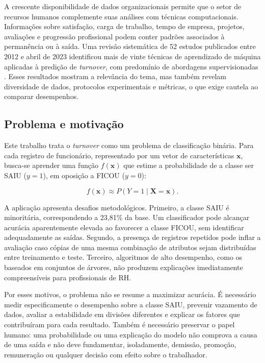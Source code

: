 \documentclass[12pt]{article}
\begin{document}
A crescente disponibilidade de dados organizacionais permite que o setor de recursos humanos complemente suas análises com técnicas computacionais. Informações sobre satisfação, carga de trabalho, tempo de empresa, projetos, avaliações e progressão profissional podem conter padrões associados à permanência ou à saída. Uma revisão sistemática de 52 estudos publicados entre 2012 e abril de 2023 identificou mais de vinte técnicas de aprendizado de máquina aplicadas à predição de \textit{turnover}, com predomínio de abordagens supervisionadas \cite{akasheh2024decade}. Esses resultados mostram a relevância do tema, mas também revelam diversidade de dados, protocolos experimentais e métricas, o que exige cautela ao comparar desempenhos.

\subsection{Problema e motivação}

Este trabalho trata o \textit{turnover} como um problema de classificação binária. Para cada registro de funcionário, representado por um vetor de características $\mathbf{x}$, busca-se aprender uma função $f(\mathbf{x})$ que estime a probabilidade de a classe ser SAIU ($y=1$), em oposição a FICOU ($y=0$):

\begin{equation}
f(\mathbf{x}) \approx P(Y=1\mid \mathbf{X}=\mathbf{x}).
\end{equation}

A aplicação apresenta desafios metodológicos. Primeiro, a classe SAIU é minoritária, correspondendo a 23,81\% da base. Um classificador pode alcançar acurácia aparentemente elevada ao favorecer a classe FICOU, sem identificar adequadamente as saídas. Segundo, a presença de registros repetidos pode inflar a avaliação caso cópias de uma mesma combinação de atributos sejam distribuídas entre treinamento e teste. Terceiro, algoritmos de alto desempenho, como os baseados em conjuntos de árvores, não produzem explicações imediatamente compreensíveis para profissionais de RH.

Por esses motivos, o problema não se resume a maximizar acurácia. É necessário medir especificamente o desempenho sobre a classe SAIU, prevenir vazamento de dados, avaliar a estabilidade em divisões diferentes e explicar os fatores que contribuíram para cada resultado. Também é necessário preservar o papel humano: uma probabilidade ou uma explicação do modelo não comprova a causa de uma saída e não deve fundamentar, isoladamente, demissão, promoção, remuneração ou qualquer decisão com efeito sobre o trabalhador.
\end{document}
